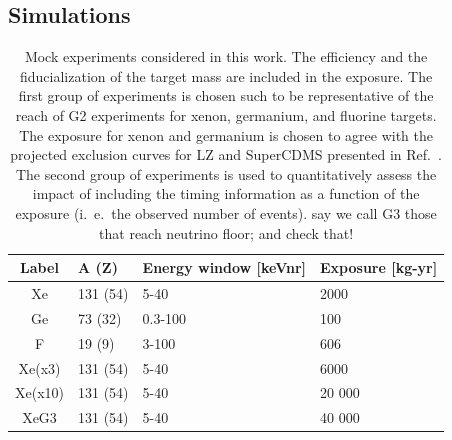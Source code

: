 \documentclass[11pt]{article}
\newcommand{\vgColor}{magenta}
\newcommand{\vg}[1]{{\color{\vgColor} #1}}
\begin{document}
\subsection{Simulations\label{sec:sims}}
\begin{table}[tbp]
  \setlength{\extrarowheight}{3pt}
  \setlength{\tabcolsep}{10pt}
  \begin{center}
	\begin{tabular}{|c||m{2.3cm}|m{4.2cm}|m{2.8cm}|}  \hline
	Label & A (Z) & Energy window [keVnr] & Exposure [kg-yr] \\ \hline
	\hline
	Xe & 131 (54) & 5-40 & 2000 \\  \hline
	Ge & 73 (32) & 0.3-100 & 100  \\  \hline
	F &  19 (9) & 3-100 & 606 \\  \hline
	\hline
	Xe(x3) & 131 (54) & 5-40 & 6000 \\  \hline
	Xe(x10) & 131 (54) & 5-40 & 20 000 \\  \hline
	XeG3 & 131 (54) & 5-40 & 40 000 \\ \hline \hline
	\end{tabular}
  \end{center}
\caption{Mock experiments considered in this work. The efficiency and the fiducialization of the target mass are included in the exposure. The first group of experiments is chosen such to be representative of the reach of G2 experiments for xenon, germanium, and fluorine targets. The exposure for xenon and germanium is chosen to agree with the projected exclusion curves for LZ and SuperCDMS presented in Ref.~\cite{Cushman:2013zza}. The second group of experiments is used to quantitatively assess the impact of including the timing information as a function of the exposure (i.~e.~the observed number of events).\vg{say we call G3 those that reach neutrino floor; and check that!} }
\label{tab:experiments}
\end{table}
\end{document}
